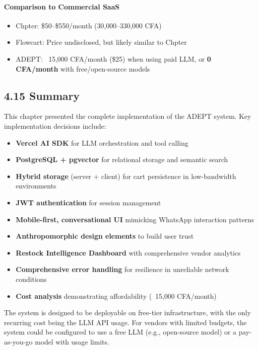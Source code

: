\documentclass[12pt,a4paper]{article}
\begin{document}
\paragraph{Comparison to Commercial SaaS}

\begin{itemize}
    \item Chpter: \$50--\$550/month (30,000--330,000 CFA)
    \item Flowcart: Price undisclosed, but likely similar to Chpter
    \item ADEPT: ~15,000 CFA/month (\$25) when using paid LLM, or \textbf{0 CFA/month} with free/open-source models
\end{itemize}

\subsection{4.15 Summary}

This chapter presented the complete implementation of the ADEPT system. Key implementation decisions include:

\begin{itemize}
    \item \textbf{Vercel AI SDK} for LLM orchestration and tool calling
    \item \textbf{PostgreSQL + pgvector} for relational storage and semantic search
    \item \textbf{Hybrid storage} (server + client) for cart persistence in low-bandwidth environments
    \item \textbf{JWT authentication} for session management
    \item \textbf{Mobile-first, conversational UI} mimicking WhatsApp interaction patterns
    \item \textbf{Anthropomorphic design elements} to build user trust
    \item \textbf{Restock Intelligence Dashboard} with comprehensive vendor analytics
    \item \textbf{Comprehensive error handling} for resilience in unreliable network conditions
    \item \textbf{Cost analysis} demonstrating affordability (~15,000 CFA/month)
\end{itemize}

The system is designed to be deployable on free-tier infrastructure, with the only recurring cost being the LLM API usage. For vendors with limited budgets, the system could be configured to use a free LLM (e.g., open-source model) or a pay-as-you-go model with usage limits.
\end{document}
